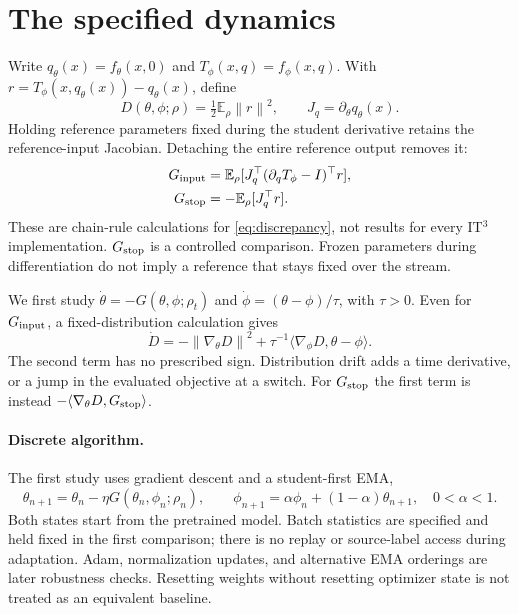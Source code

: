 \documentclass[11pt,a4paper]{article}
\newcommand{\E}{\mathbb{E}}
\newcommand{\norm}[1]{\left\lVert #1\right\rVert}
\begin{document}
\section{The specified dynamics}
Write $q_\theta(x)=f_\theta(x,0)$ and $T_\phi(x,q)=f_\phi(x,q)$. With
$r=T_\phi(x,q_\theta(x))-q_\theta(x)$, define
\begin{equation}
 D(\theta,\phi;\rho)=\tfrac12\E_\rho\norm{r}^2,
 \qquad J_q=\partial_\theta q_\theta(x).
 \label{eq:discrepancy}
\end{equation}
Holding reference parameters fixed during the student derivative retains
the reference-input Jacobian. Detaching the entire reference output removes it:
\begin{align}
 G_{\rm input}&=\E_\rho[J_q^\top(\partial_qT_\phi-I)^\top r],
 \label{eq:input}\\
 G_{\rm stop}&=-\E_\rho[J_q^\top r].
 \label{eq:stop}
\end{align}
These are chain-rule calculations for \eqref{eq:discrepancy}, not results
for every IT$^3$ implementation. $G_{\rm stop}$ is a controlled comparison.
Frozen parameters during differentiation do not imply a reference that
stays fixed over the stream.

We first study $\dot\theta=-G(\theta,\phi;\rho_t)$ and
$\dot\phi=(\theta-\phi)/\tau$, with $\tau>0$. Even for $G_{\rm input}$,
a fixed-distribution calculation gives
\begin{equation}
 \dot D=-\norm{\nabla_\theta D}^2
 +\tau^{-1}\langle\nabla_\phi D,\theta-\phi\rangle.
 \label{eq:energy}
\end{equation}
The second term has no prescribed sign. Distribution drift adds a time
derivative, or a jump in the evaluated objective at a switch. For
$G_{\rm stop}$ the first term is instead
$-\langle\nabla_\theta D,G_{\rm stop}\rangle$.

\paragraph{Discrete algorithm.}
The first study uses gradient descent and a student-first EMA,
\begin{equation}
 \theta_{n+1}=\theta_n-\eta G(\theta_n,\phi_n;\rho_n),\qquad
 \phi_{n+1}=\alpha\phi_n+(1-\alpha)\theta_{n+1},\quad 0<\alpha<1.
 \label{eq:discrete}
\end{equation}
Both states start from the pretrained model. Batch statistics are specified
and held fixed in the first comparison; there is no replay or source-label
access during adaptation. Adam, normalization updates, and alternative EMA
orderings are later robustness checks. Resetting weights without resetting
optimizer state is not treated as an equivalent baseline.
\end{document}

